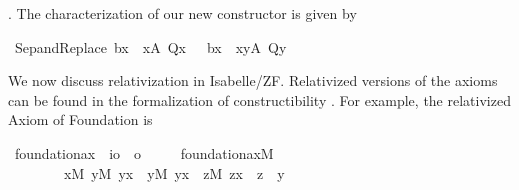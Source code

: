 . The
characterization of our new constructor is given by
\begin{isabelle}
\isamarkupfalse%
\ Sep{\isacharunderscore}and{\isacharunderscore}Replace{\isacharcolon}\ {\isachardoublequoteopen}{\isacharbraceleft}b{\isacharparenleft}x{\isacharparenright}\ {\isachardot}{\isachardot}\ x{\isasymin}A{\isacharcomma}\ Q{\isacharparenleft}x{\isacharparenright}\ {\isacharbraceright}\ {\isacharequal}\ {\isacharbraceleft}b{\isacharparenleft}x{\isacharparenright}\ {\isachardot}\ x{\isasymin}{\isacharbraceleft}y{\isasymin}A{\isachardot}\ Q{\isacharparenleft}y{\isacharparenright}{\isacharbraceright}{\isacharbraceright}{\isachardoublequoteclose}
\end{isabelle}


We now discuss relativization in Isabelle/ZF. Relativized versions of the
 axioms can be found in the formalization of constructibility \cite{paulson_2003}. For
 example, the relativized Axiom of Foundation is
\begin{isabelle}
\isamarkupfalse%
\ foundation{\isacharunderscore}ax\ {\isacharcolon}{\isacharcolon}\ {\isachardoublequoteopen}{\isacharparenleft}i{\isacharequal}{\isachargreater}o{\isacharparenright}\ {\isacharequal}{\isachargreater}\ o{\isachardoublequoteclose}\ \isanewline
\ \ \ \ {\isachardoublequoteopen}foundation{\isacharunderscore}ax{\isacharparenleft}M{\isacharparenright}\ {\isacharequal}{\isacharequal}\isanewline
\ \ \ \ \ \ \ \ {\isasymforall}x{\isacharbrackleft}M{\isacharbrackright}{\isachardot}\ {\isacharparenleft}{\isasymexists}y{\isacharbrackleft}M{\isacharbrackright}{\isachardot}\ y{\isasymin}x{\isacharparenright}\ {\isasymlongrightarrow}\ {\isacharparenleft}{\isasymexists}y{\isacharbrackleft}M{\isacharbrackright}{\isachardot}\ y{\isasymin}x\ {\isacharampersand}\ {\isachartilde}{\isacharparenleft}{\isasymexists}z{\isacharbrackleft}M{\isacharbrackright}{\isachardot}\ z{\isasymin}x\ {\isacharampersand}\ z\ {\isasymin}\ y{\isacharparenright}{\isacharparenright}{\isachardoublequoteclose}
\end{isabelle}

